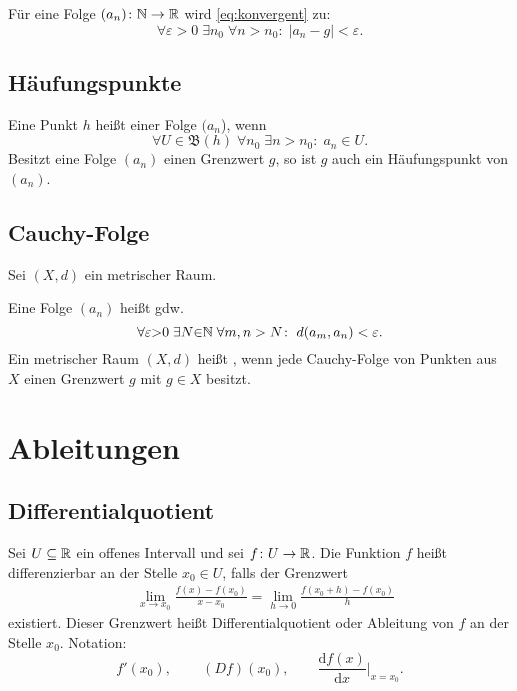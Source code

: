 Für eine Folge $(a_n)\colon\mathbb N\to\mathbb R$ wird \eqref{eq:konvergent} zu:
\begin{equation}
\forall\varepsilon{>}0\;\exists n_0\;\forall n{>}n_0\colon\;
|a_n-g|<\varepsilon.
\end{equation}

\subsection{Häufungspunkte}
Eine Punkt $h$ heißt  einer Folge $(a_n$), wenn
\begin{equation}
\forall U{\in}\mathfrak B(h)\;\forall n_0\;\exists n{>}n_0\colon\;
a_n\in U.
\end{equation}
Besitzt eine Folge $(a_n)$ einen Grenzwert $g$, so ist $g$ auch ein
Häufungspunkt von $(a_n)$.

\subsection{Cauchy-Folge}
Sei $(X,d)$ ein metrischer Raum.

\noindent
{} Eine Folge $(a_n)$ heißt 
gdw.
\begin{equation}
\forall\varepsilon{>}0\;\exists N{\in}\mathbb N\;\forall m,n>N\colon\;
d(a_m,a_n)<\varepsilon.
\end{equation}
Ein metrischer Raum $(X,d)$ heißt , wenn jede
Cauchy-Folge von Punkten aus $X$ einen Grenzwert $g$ mit $g\in X$
besitzt.

\section{Ableitungen}
\subsection{Differentialquotient}
Sei $U\subseteq\mathbb R$ ein offenes Intervall
und sei $f\colon U\to\mathbb R$. Die Funktion $f$ heißt
differenzierbar
an der Stelle $x_0\in U$, falls der Grenzwert
\begin{equation}
\begin{split}
&\lim_{x\to x_0} \frac{f(x)-f(x_0)}{x-x_0}
= \lim_{h\to 0}\frac{f(x_0+h)-f(x_0)}{h}
\end{split}
\end{equation}
existiert. Dieser Grenzwert heißt
Differentialquotient oder Ableitung
von $f$ an der Stelle $x_0$. Notation:
\begin{equation}
f'(x_0),\,\qquad (Df)(x_0),\qquad \frac{\mathrm df(x)}{\mathrm dx}\Big|_{x=x_0}.
\end{equation}

